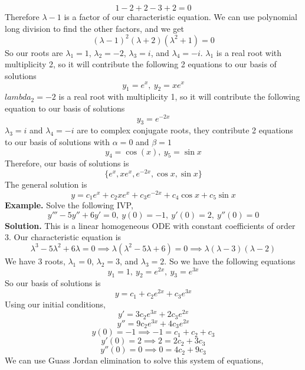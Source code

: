 \documentclass[openany]{report}
\begin{document}
\[1 - 2 + 2 - 3  + 2 = 0 \]
Therefore $\lambda -1$ is a factor of our characteristic equation. We can use polynomial long division to find the other factors, and we get 
\[(\lambda - 1)^2(\lambda + 2)(\lambda^2 + 1) = 0\]
So our roots are $\lambda_1 = 1$, $\lambda_2 = -2$, $\lambda_3 = i$, and $\lambda_4 = -i$. $\lambda_1$ is a real root with multiplicity 2, so it will contribute the following 2 equations to our basis of solutions 
\[y_1 = e^x, \ y_2 = xe^{x}\]
$lambda_2 = -2$ is a real root with multiplicity 1, so it will contribute the following equation to our basis of solutions
\[y_3 = e^{-2x}\]
$\lambda_3 = i$ and $\lambda_4 = -i$ are to complex conjugate roots, they contribute 2 equations to our basis of solutions with $\alpha = 0$ and $\beta = 1$
\[y_4 = \cos(x), \ y_5 = \sin x\]
Therefore, our basis of solutions is
\[\{e^{x}, xe^{x}, e^{-2x}, \cos x, \sin x\}\]
The general solution is
\[y = c_1e^{x} + c_2xe^{x} + c_3e^{-2x} + c_4\cos x + c_5 \sin x\]
\textbf{Example.} Solve the following IVP, 
\[y''' - 5y'' + 6y' = 0, \ y(0) = -1, \ y'(0) = 2, \ y''(0) = 0\]
\textbf{Solution.} This is a linear homogeneous ODE with constant coefficients of order 3. Our characteristic equation is
\[\lambda^3 - 5\lambda^2 + 6\lambda = 0 \implies \lambda(\lambda^2 - 5\lambda + 6) = 0 \implies \lambda(\lambda - 3)(\lambda -2)\]
We have 3 roots, $\lambda_1 = 0$, $\lambda_2 = 3$, and $\lambda_3 = 2$. So we have the following equations 
\[y_1 = 1, \ y_2 = e^{2x}, \ y_3 = e^{3x}\]
So our basis of solutions is
\[y = c_1 + c_2e^{2x} + c_3e^{3x}\]
Using our initial conditions, 
\[y' = 3c_2e^{3x} + 2c_3e^{2x}\]
\[y'' = 9c_2e^{3x} + 4c_3e^{2x}\]
\[y(0) = -1 \implies -1 = c_1 + c_2+ c_3\]
\[y'(0) = 2 \implies 2 = 2c_2 + 3c_3\]
\[y''(0) = 0 \implies 0 = 4c_2 + 9c_3\]
We can use Guass Jordan elimination to solve this system of equations,
\end{document}
